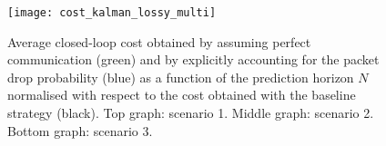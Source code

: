 \documentclass[letterpaper, 10 pt, conference]{ieeeconf}  %
\begin{document}
\begin{figure}
	\begin{center}
		\texttt{[image: cost\_kalman\_lossy\_multi]}
		\caption{Average closed-loop cost obtained by assuming perfect communication (green) and by explicitly accounting for the packet drop probability (blue) as a function of the prediction horizon $N$ normalised with respect to the cost obtained with the baseline strategy (black). Top graph: scenario 1. Middle graph: scenario 2. Bottom graph: scenario 3. }
		\label{fig:cost_lossy}
	\end{center}
\end{figure}



%
%
%
%
\end{document}
